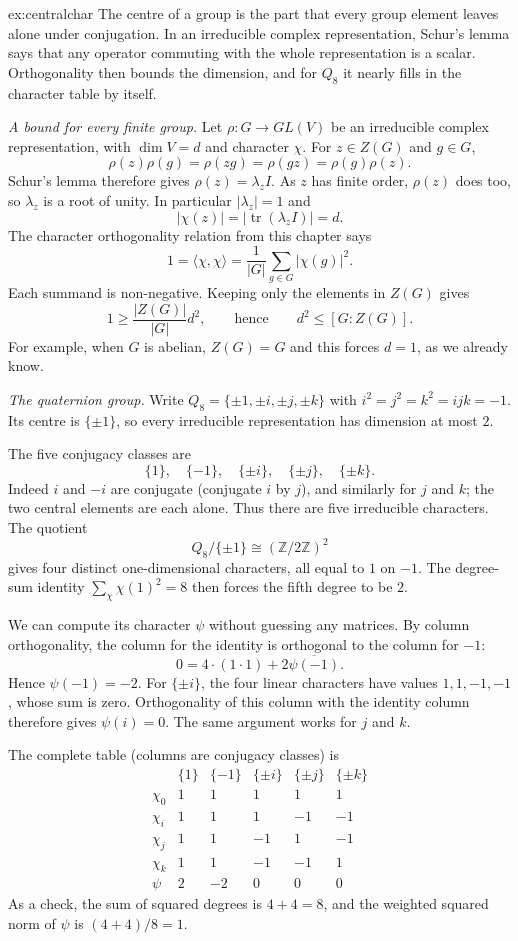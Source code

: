 \begin{solution}{ex:centralchar}
\idea The centre of a group is the part that every group element leaves alone under conjugation. In an irreducible complex representation, Schur's lemma says that any operator commuting with the whole representation is a scalar. Orthogonality then bounds the dimension, and for $Q_8$ it nearly fills in the character table by itself.

\writeup \emph{A bound for every finite group.}
Let $\rho:G\to GL(V)$ be an irreducible complex representation, with $\dim V=d$ and character $\chi$. For $z\in Z(G)$ and $g\in G$,
\[
\rho(z)\rho(g)=\rho(zg)=\rho(gz)=\rho(g)\rho(z).
\]
Schur's lemma therefore gives $\rho(z)=\lambda_z I$. As $z$ has finite order, $\rho(z)$ does too, so $\lambda_z$ is a root of unity. In particular $|\lambda_z|=1$ and
\[
|\chi(z)|=|\operatorname{tr}(\lambda_z I)|=d.
\]
The character orthogonality relation from this chapter says
\[
1=\langle\chi,\chi\rangle
 =\frac1{|G|}\sum_{g\in G}|\chi(g)|^2.
\]
Each summand is non-negative. Keeping only the elements in $Z(G)$ gives
\[
1\ge\frac{|Z(G)|}{|G|}d^2,
\qquad\text{hence}\qquad
\boxed{d^2\le [G:Z(G)]}.
\]
For example, when $G$ is abelian, $Z(G)=G$ and this forces $d=1$, as we already know.

\emph{The quaternion group.}
Write $Q_8=\{\pm1,\pm i,\pm j,\pm k\}$ with $i^2=j^2=k^2=ijk=-1$. Its centre is $\{\pm1\}$, so every irreducible representation has dimension at most $2$.

The five conjugacy classes are
\[
\{1\},\quad\{-1\},\quad\{\pm i\},\quad\{\pm j\},\quad\{\pm k\}.
\]
Indeed $i$ and $-i$ are conjugate (conjugate $i$ by $j$), and similarly for $j$ and $k$; the two central elements are each alone. Thus there are five irreducible characters. The quotient
\[
Q_8/\{\pm1\}\cong(\mathbb Z/2\mathbb Z)^2
\]
gives four distinct one-dimensional characters, all equal to $1$ on $-1$. The degree-sum identity $\sum_\chi\chi(1)^2=8$ then forces the fifth degree to be $2$.

We can compute its character $\psi$ without guessing any matrices. By column orthogonality, the column for the identity is orthogonal to the column for $-1$:
\[
0=4\cdot(1\cdot1)+2\overline{\psi(-1)}.
\]
Hence $\psi(-1)=-2$. For $\{\pm i\}$, the four linear characters have values $1,1,-1,-1$, whose sum is zero. Orthogonality of this column with the identity column therefore gives $\psi(i)=0$. The same argument works for $j$ and $k$.

The complete table (columns are conjugacy classes) is
\[
\begin{array}{c|rrrrr}
 &\{1\}&\{-1\}&\{\pm i\}&\{\pm j\}&\{\pm k\}\\ \hline
\chi_0&1&1&1&1&1\\
\chi_i&1&1&1&-1&-1\\
\chi_j&1&1&-1&1&-1\\
\chi_k&1&1&-1&-1&1\\
\psi&2&-2&0&0&0
\end{array}
\]
As a check, the sum of squared degrees is $4+4=8$, and the weighted squared norm of $\psi$ is $(4+4)/8=1$.


\end{solution}
